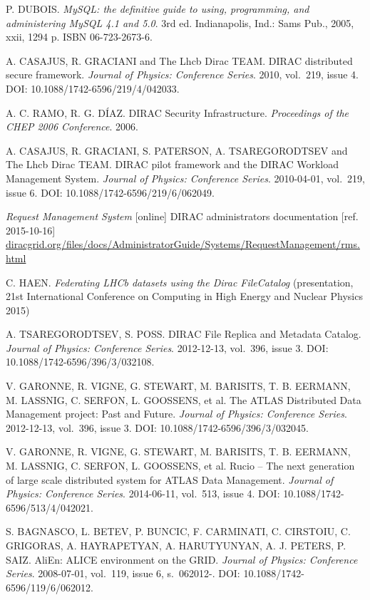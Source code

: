 \begin{thebibliography}{99}
	P. DUBOIS. \textit{MySQL: the definitive guide to using, programming, and administering MySQL 4.1 and 5.0}. 
	3rd ed. Indianapolis, Ind.: Sams Pub., 2005, xxii, 1294 p. ISBN 06-723-2673-6.

	A. CASAJUS,  R. GRACIANI and The Lhcb Dirac TEAM. 
	DIRAC distributed secure framework. 
	\textit{Journal of Physics: Conference Series}. 2010, vol.~219, issue 4. 
	DOI: 10.1088/1742-6596/219/4/042033. 

	A. C. RAMO, R. G. DÍAZ. 
	DIRAC Security Infrastructure. 
	\textit{Proceedings of the CHEP 2006 Conference}. 2006. 
	
	A. CASAJUS, R. GRACIANI, S. PATERSON, A. TSAREGORODTSEV and The Lhcb Dirac TEAM. 
	DIRAC pilot framework and the DIRAC Workload Management System. 
	\textit{Journal of Physics: Conference Series}. 2010-04-01, vol.~219, issue 6. 
	DOI: 10.1088/1742-6596/219/6/062049. 
	
	\emph{Request Management System} [online] 
	DIRAC administrators documentation [ref. 2015-10-16]
	\url{diracgrid.org/files/docs/AdministratorGuide/Systems/RequestManagement/rms.html}
	
	C. HAEN.	
	\textit{Federating LHCb datasets using the Dirac FileCatalog}
	(presentation, 21st International Conference on Computing in High Energy and Nuclear Physics 2015)
	
	A. TSAREGORODTSEV, S. POSS. 
	DIRAC File Replica and Metadata Catalog. 
	\textit{Journal of Physics: Conference Series}. 2012-12-13, vol.~396, issue 3. 
	DOI: 10.1088/1742-6596/396/3/032108. 
	
	V. GARONNE, R. VIGNE, G. STEWART, M. BARISITS, T. B. EERMANN, M. LASSNIG, C. SERFON, L. GOOSSENS, et al. 
	The ATLAS Distributed Data Management project: Past and Future. 
	\textit{Journal of Physics: Conference Series}. 2012-12-13, vol.~396, issue 3.
	DOI: 10.1088/1742-6596/396/3/032045. 
	
	V. GARONNE, R. VIGNE, G. STEWART, M. BARISITS, T. B. EERMANN, M. LASSNIG, C. SERFON, L. GOOSSENS, et al. 
	Rucio – The next generation of large scale distributed system for ATLAS Data Management. 
	\textit{Journal of Physics: Conference Series}. 2014-06-11, vol.~513, issue 4.
	DOI: 10.1088/1742-6596/513/4/042021.
	
	S. BAGNASCO, L. BETEV, P. BUNCIC, F. CARMINATI, C. CIRSTOIU, C. GRIGORAS, A. HAYRAPETYAN, A. HARUTYUNYAN, 
	A. J. PETERS, P. SAIZ. 
	AliEn: ALICE environment on the GRID. 
	\textit{Journal of Physics: Conference Series}. 2008-07-01, vol.~119, issue 6, s.~062012-. 
	DOI: 10.1088/1742-6596/119/6/062012.


\end{thebibliography}
